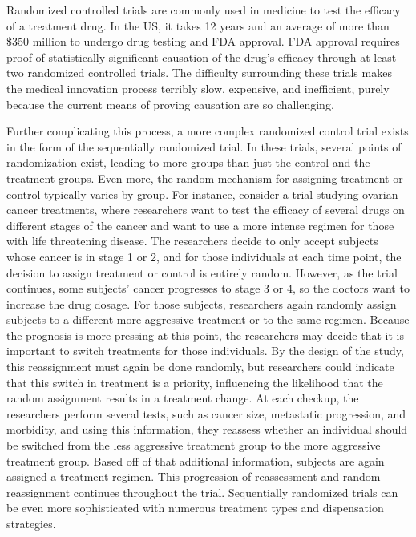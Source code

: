 Randomized controlled trials are commonly used in medicine to test the efficacy of a treatment drug.  In the US, it takes 12 years and an average of more than \$350 million to undergo drug testing and FDA approval.\cite{drugapproval}  FDA approval requires proof of statistically significant causation of the drug's efficacy through at least two randomized controlled trials.  The difficulty surrounding these trials makes the medical innovation process terribly slow, expensive, and inefficient, purely because the current means of proving causation are so challenging.  
 
Further complicating this process, a more complex randomized control trial exists in the form of the sequentially randomized trial.  In these trials, several points of randomization exist, leading to more groups than just the control and the treatment groups.  Even more, the random mechanism for assigning treatment or control typically varies by group.  For instance, consider a trial studying ovarian cancer treatments, where researchers want to test the efficacy of several drugs on different stages of the cancer and want to use a more intense regimen for those with life threatening disease.  The researchers decide to only accept subjects whose cancer is in stage 1 or 2, and for those individuals at each time point, the decision to assign treatment or control is entirely random.  However, as the trial continues, some subjects' cancer progresses to stage 3 or 4, so the doctors want to increase the drug dosage.  For those subjects, researchers again randomly assign subjects to a different more aggressive treatment or to the same regimen.  Because the prognosis is more pressing at this point, the researchers may decide that it is important to switch treatments for those individuals.  By the design of the study, this reassignment must again be done randomly, but researchers could indicate that this switch in treatment is a priority, influencing the likelihood that the random assignment results in a treatment change.  At each checkup, the researchers perform several tests, such as cancer size, metastatic progression, and morbidity, and using this information, they reassess whether an individual should be switched from the less aggressive treatment group to the more aggressive treatment group. Based off of that additional information, subjects are again assigned a treatment regimen.  This progression of reassessment and random reassignment continues throughout the trial.  Sequentially randomized trials can be even more sophisticated with numerous treatment types and dispensation strategies.\cite{doi:10.1093/jnci/djm185}  

